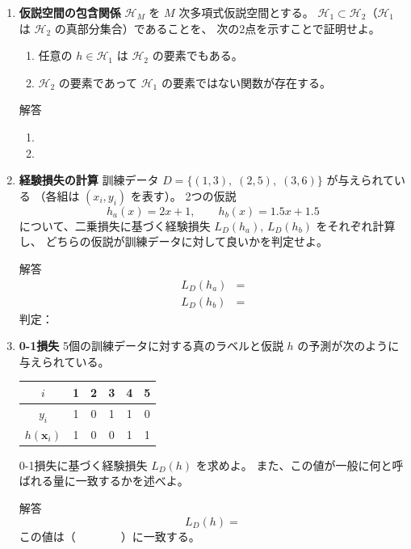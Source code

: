 \documentclass[a4paper,dvipdfmx]{jsarticle}
\newcommand{\学籍番号}{0000000}
\newcommand{\氏名}{氏名を書く}
\newcommand{\提出日}{2026年10月1日}
\newenvironment{answer}{\begin{itembox}[l]{解答}}{\end{itembox}}
\begin{document}
\begin{enumerate}
  \item \textbf{仮説空間の包含関係}\quad
    $\mathcal{H}_M$ を $M$ 次多項式仮説空間とする。
    $\mathcal{H}_1 \subset \mathcal{H}_2$（$\mathcal{H}_1$ は $\mathcal{H}_2$ の真部分集合）であることを、
    次の2点を示すことで証明せよ。
    \begin{enumerate}
      \item 任意の $h \in \mathcal{H}_1$ は $\mathcal{H}_2$ の要素でもある。
      \item $\mathcal{H}_2$ の要素であって $\mathcal{H}_1$ の要素ではない関数が存在する。
    \end{enumerate}
    \begin{answer}
      \begin{enumerate}
        \item
        \item
      \end{enumerate}
    \end{answer}

  \item \textbf{経験損失の計算}\quad
    訓練データ $D = \{(1, 3),\; (2, 5),\; (3, 6)\}$ が与えられている
    （各組は $(x_i, y_i)$ を表す）。
    2つの仮説
    \begin{equation*}
      h_a(x) = 2x + 1, \qquad h_b(x) = 1.5x + 1.5
    \end{equation*}
    について、二乗損失に基づく経験損失 $L_D(h_a)$, $L_D(h_b)$ をそれぞれ計算し、
    どちらの仮説が訓練データに対して良いかを判定せよ。
    \begin{answer}
      \begin{align*}
        L_D(h_a) &= \\
        L_D(h_b) &=
      \end{align*}
      判定：
    \end{answer}

  \item \textbf{0-1損失}\quad
    5個の訓練データに対する真のラベルと仮説 $h$ の予測が次のように与えられている。
    \begin{center}
      \begin{tabular}{c|ccccc}
        $i$ & 1 & 2 & 3 & 4 & 5 \\
        \hline
        $y_i$ & 1 & 0 & 1 & 1 & 0 \\
        $h(\bm{x}_i)$ & 1 & 0 & 0 & 1 & 1 \\
      \end{tabular}
    \end{center}
    0-1損失に基づく経験損失 $L_D(h)$ を求めよ。
    また、この値が一般に何と呼ばれる量に一致するかを述べよ。
    \begin{answer}
      \begin{equation*}
        L_D(h) =
      \end{equation*}
      この値は（　　　　）に一致する。
    \end{answer}


\end{enumerate}
\end{document}
